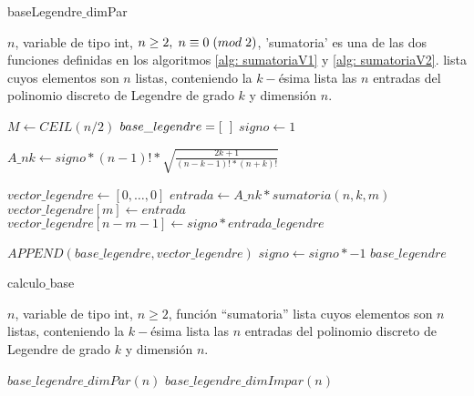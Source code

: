 \begin{algorithm}
\caption{baseLegendre$\_$dimPar}\label{alg: legendre par}
\begin{algorithmic} [1]
\REQUIRE $n$, variable de tipo int, $n \geq 2, \hspace{0.1cm} n \equiv 0 \hspace{0.1cm} (mod \hspace{0.1cm} 2)$, 'sumatoria' es una de las dos funciones definidas en los algoritmos
\ref{alg: sumatoriaV1} y \ref{alg: sumatoriaV2}.
\ENSURE lista cuyos elementos son $n$ listas, conteniendo
la $k-$ésima lista las $n$ entradas del polinomio discreto de Legendre de
grado $k$ y dimensión $n$.


\STATE $M \leftarrow CEIL(n/2)$
\STATE $base\_legendre=[ \hspace{0.2cm} ]$ 
\STATE $signo \leftarrow 1$ 

\STATE $A\_nk \leftarrow signo * (n-1)!*
\sqrt{\frac{
2k+1
}{
(n-k-1)!*(n+k)!
}}$

\STATE $vector\_legendre \leftarrow [ 0, \ldots , 0]$  
\STATE $entrada \leftarrow A\_nk * sumatoria(n,k,m)$
\STATE $vector\_legendre[m] \leftarrow entrada$ 
\STATE $vector\_legendre[n-m-1] \leftarrow signo *entrada\_legendre$
\ENDFOR

\STATE $APPEND(base\_legendre, vector\_legendre)$
\STATE $signo \leftarrow signo * -1$
\ENDFOR
\RETURN $base\_legendre$
\end{algorithmic}
\end{algorithm}



\begin{algorithm}
\caption{calculo$\_$base}\label{alg: legendre}
\begin{algorithmic} [1]
\REQUIRE $n$, variable de tipo int, $n \geq 2$, función ``sumatoria''
\ENSURE lista cuyos elementos son $n$ listas, conteniendo
la $k-$ésima lista las $n$ entradas del polinomio discreto de Legendre de
grado $k$ y dimensión $n$.

\STATE $base\_legendre\_dimPar(n)$
\ELSE
\STATE $base\_legendre\_dimImpar(n)$
\ENDIF
\end{algorithmic}
\end{algorithm}


